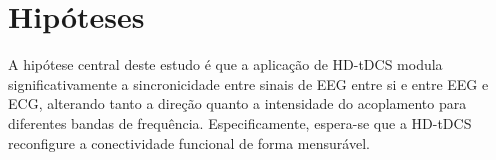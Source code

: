 \chapter{Hipóteses}
\label{chap:hipoteses}

A hipótese central deste estudo é que a aplicação de HD-tDCS modula significativamente a sincronicidade entre sinais de EEG entre si e entre EEG e ECG, alterando tanto a direção quanto a intensidade do acoplamento para diferentes bandas de frequência. Especificamente, espera-se que a HD-tDCS reconfigure a conectividade funcional de forma mensurável.